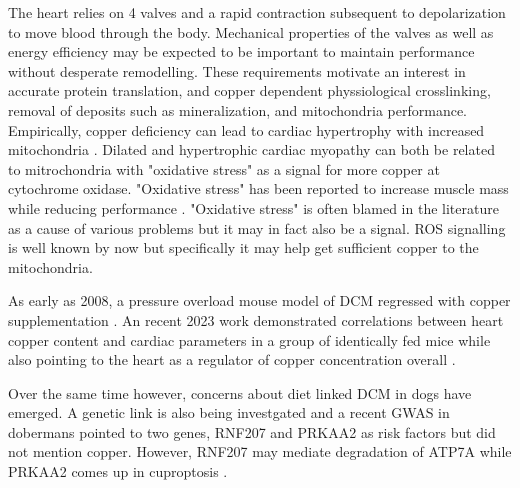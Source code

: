 {The heart relies on 4 valves and a rapid contraction subsequent
to depolarization to move blood through the body. Mechanical
properties of the valves as well as energy efficiency may be expected
to be important to maintain performance without desperate remodelling. 
These requirements motivate an interest in accurate protein
translation, and copper dependent physsiological crosslinking, removal of
deposits such as mineralization, and mitochondria performance. 
Empirically, copper deficiency can lead to cardiac hypertrophy with increased
mitochondria \cite{PMID12539966}.
Dilated and hypertrophic cardiac myopathy can both
be related to mitrochondria with  "oxidative stress"
as a signal for more copper at cytochrome oxidase. "Oxidative stress"
has been reported to increase muscle mass while 
reducing performance \cite{Ahn_Ranjit_Premkumar_Mitochondrial_oxidative_stress_impairs_2019}.
"Oxidative stress" is often blamed in the literature as 
a cause of various problems but it may in fact also be a signal.
ROS signalling is well known by now but specifically
it may help get sufficient copper to the mitochondria.

As early as 2008, a pressure overload mouse model of DCM 
regressed with copper supplementation
\cite{PMC2671677}.
An recent 2023 work demonstrated correlations between heart copper
content and cardiac parameters in a group of identically fed mice
while also pointing to the heart as a regulator of copper concentration
overall \cite{10.3389/fcvm.2023.1089963}.


Over the  same time however, concerns about diet linked
DCM in dogs have emerged.  A genetic link is also being
investgated and a recent GWAS in dobermans pointed to two genes,
RNF207 and PRKAA2 as risk factors \cite{PMC10506233}
 but did not mention copper. 
However, RNF207 may mediate degradation of ATP7A
\cite{Zhao_Zeng_Wang_Targeting_2023}
while PRKAA2 comes up in cuproptosis 
\cite{10.3389/fcell.2022.996307}.

}
